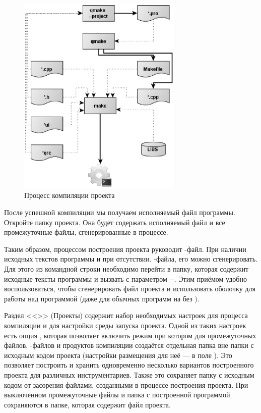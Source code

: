 \begin{figure}[htb]
\begin{center}
\includegraphics[width=0.7\textwidth]{img/ris_12_1}
\caption{Процесс компиляции проекта}
\label{ch12:refDrawing0}
\end{center}
\end{figure}

После успешной компиляции мы получаем исполняемый файл программы. Откройте папку проекта. Она будет
содержать исполняемый файл и все промежуточные файлы, сгенерированные в процессе.

Таким образом, процессом построения проекта руководит -файл. При наличии исходных текстов программы и
при отсутствии. -файла, его можно сгенерировать. Для этого из командной строки
необходимо перейти в папку, которая содержит исходные тексты программы и вызвать 
с параметром -{-}. Этим приёмом удобно
воспользоваться, чтобы сгенерировать файл проекта и использовать оболочку 
для работы над программой (даже для обычных программ на  без ).

Раздел <<>> (Проекты) содержит набор
необходимых настроек для процесса компиляции и для настройки среды запуска проекта. Одной
из таких настроек есть опция , которая 
позволяет включить режим при котором для промежуточных файлов,
-файлов и продуктов компиляции создаётся отдельная папка вне папки с исходным кодом проекта
(настройки размещения для неё --- в поле ). Это позволяет построить и
хранить одновременно несколько вариантов построенного проекта для различных инструментариев. Также это сохраняет папку
с исходным кодом от засорения файлами, созданными в процессе построения проекта. При выключенном  промежуточные файлы и папка с построенной программой сохраняются в папке, которая содержит файл
проекта.


